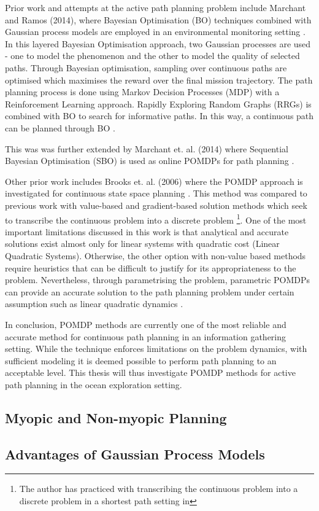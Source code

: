 		Prior work and attempts at the active path planning problem include Marchant and Ramos (2014), where Bayesian Optimisation (BO) techniques combined with Gaussian process models are employed in an environmental monitoring setting \citep{BayesianOptimisation}. In this layered Bayesian Optimisation approach, two Gaussian processes are used - one to model the phenomenon and the other to model the quality of selected paths. Through Bayesian optimisation, sampling over continuous paths are optimised which maximises the reward over the final mission trajectory. The path planning process is done using Markov Decision Processes (MDP) with a Reinforcement Learning approach. Rapidly Exploring Random Graphs (RRGs) is combined with BO to search for informative paths. In this way, a continuous path can be planned through BO \citep{BayesianOptimisation}.
		
		This was was further extended by Marchant et. al. (2014) where Sequential Bayesian Optimisation (SBO) is used as online POMDPs for path planning \citep{SequentialBayesianOptimisation}.
		
		Other prior work includes Brooks et. al. (2006) where the POMDP approach is investigated for continuous state space planning \citep{ParametricPOMDP}. This method was compared to previous work with value-based and gradient-based solution methods which seek to transcribe the continuous problem into a discrete problem \footnote{{\color{BurntOrange} The author has practiced with transcribing the continuous problem into a discrete problem in a shortest path setting in}}. One of the most important limitations discussed in this work is that analytical and accurate solutions exist almost only for linear systems with quadratic cost (Linear Quadratic Systems). Otherwise, the other option with non-value based methods require heuristics that can be difficult to justify for its appropriateness to the problem. Nevertheless, through parametrising the problem, parametric POMDPs can provide an accurate solution to the path planning problem under certain assumption such as linear quadratic dynamics \citep{ParametricPOMDP}.
		
		In conclusion, POMDP methods are currently one of the most reliable and accurate method for continuous path planning in an information gathering setting. While the technique enforces limitations on the problem dynamics, with sufficient modeling it is deemed possible to perform path planning to an acceptable level. This thesis will thus investigate POMDP methods for active path planning in the ocean exploration setting.
		
		\subsection{Myopic and Non-myopic Planning}
		\label{Background:InformativePathPlanning:MyopicNonmyopicPlanning}
		
		\subsection{Advantages of Gaussian Process Models}
		\label{Background:InformativePathPlanning:GaussianProcessAdvantage}
		
		